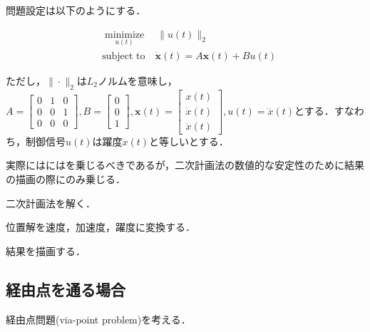 問題設定は以下のようにする．


\begin{align}
&\underset{u(t)}{\operatorname{minimize}}\quad \|u(t)\|_2 \\
&\text{subject to} \quad \dot{\mathbf{x}}(t)=A \mathbf{x}(t)+B u(t)
\end{align}


ただし，$\|\cdot\|_{2}$は$L_{2}$ノルムを意味し，$A=\left[\begin{array}{lll}0 & 1 & 0 \\ 0 & 0 & 1 \\ 0 & 0 & 0\end{array}\right], B=\left[\begin{array}{l}0 \\ 0 \\ 1\end{array}\right], \mathbf{x}(t)=\left[\begin{array}{l}x(t) \\ \dot{x}(t) \\ \ddot{x}(t)\end{array}\right], u(t)=\dddot x(t)$とする．すなわち，制御信号$u(t)$は躍度$\dddot x(t)$と等しいとする．


実際にはにはを乗じるべきであるが，二次計画法の数値的な安定性のために結果の描画の際にのみ乗じる．

二次計画法を解く．

位置解を速度，加速度，躍度に変換する．

結果を描画する．


\subsection{経由点を通る場合}
経由点問題(via-point problem)を考える．




